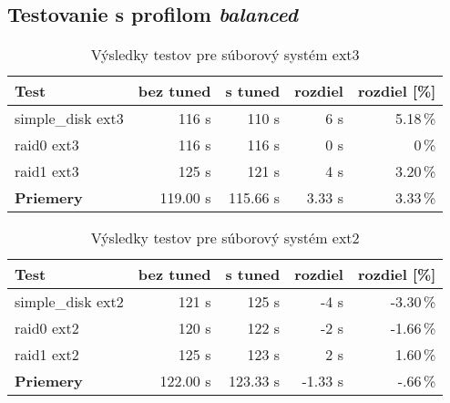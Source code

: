 %
%
\subsection{Testovanie s profilom \emph{balanced}}

\begin{table}[H]
\begin{center}
\begin{tabular}{|l|r|r|r|r|}
    \hline
    \textbf{Test} & \textbf{bez tuned} & \textbf{s tuned} & \textbf{rozdiel} & \textbf{rozdiel [\%]} \\ \hline
    simple\_disk ext3 & 116 s & 110 s & 6 s & 5.18\,\% \\
    \hline
    raid0 ext3 & 116 s & 116 s & 0 s & 0\,\% \\
    \hline
    raid1 ext3 & 125 s & 121 s & 4 s & 3.20\,\% \\
    \hline
    \textbf{Priemery} & 119.00 s & 115.66 s & 3.33 s & 3.33\,\% \\
    \hline
\end{tabular}
\caption{Výsledky testov pre súborový systém ext3}
\label{tab:results-ext3}
\end{center}
\end{table}

\begin{table}[H]
\begin{center}
\begin{tabular}{|l|r|r|r|r|}
    \hline
    \textbf{Test} & \textbf{bez tuned} & \textbf{s tuned} & \textbf{rozdiel} & \textbf{rozdiel [\%]} \\ \hline
    simple\_disk ext2 & 121 s & 125 s & -4 s & -3.30\,\% \\
    \hline
    raid0 ext2 & 120 s & 122 s & -2 s & -1.66\,\% \\
    \hline
    raid1 ext2 & 125 s & 123 s & 2 s & 1.60\,\% \\
    \hline
    \textbf{Priemery} & 122.00 s & 123.33 s & -1.33 s & -.66\,\% \\
    \hline
\end{tabular}
\caption{Výsledky testov pre súborový systém ext2}
\label{tab:results-ext2}
\end{center}
\end{table}

